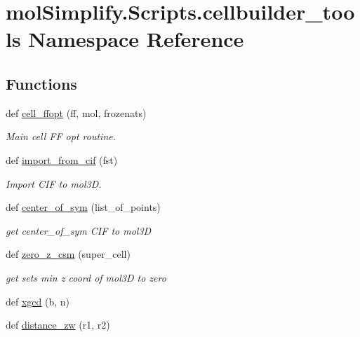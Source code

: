 \hypertarget{namespacemolSimplify_1_1Scripts_1_1cellbuilder__tools}{}\section{mol\+Simplify.\+Scripts.\+cellbuilder\+\_\+tools Namespace Reference}
\label{namespacemolSimplify_1_1Scripts_1_1cellbuilder__tools}
\subsection*{Functions}
\begin{DoxyCompactItemize}
\item 
def \hyperlink{namespacemolSimplify_1_1Scripts_1_1cellbuilder__tools_afa7cdfc8a30fd53f9784466e662d2aec}{cell\+\_\+ffopt} (ff, mol, frozenats)
\begin{DoxyCompactList}\small\item\em Main cell FF opt routine. \end{DoxyCompactList}\item 
def \hyperlink{namespacemolSimplify_1_1Scripts_1_1cellbuilder__tools_af7e25ca0eee7ea70e3d886dfac1b77ff}{import\+\_\+from\+\_\+cif} (fst)
\begin{DoxyCompactList}\small\item\em Import C\+IF to mol3D. \end{DoxyCompactList}\item 
def \hyperlink{namespacemolSimplify_1_1Scripts_1_1cellbuilder__tools_af7ec418e4139cc025c32ac5a789ec8bd}{center\+\_\+of\+\_\+sym} (list\+\_\+of\+\_\+points)
\begin{DoxyCompactList}\small\item\em get center\+\_\+of\+\_\+sym C\+IF to mol3D \end{DoxyCompactList}\item 
def \hyperlink{namespacemolSimplify_1_1Scripts_1_1cellbuilder__tools_a14494cd56f48f40e5437d8ca73f4b706}{zero\+\_\+z\+\_\+csm} (super\+\_\+cell)
\begin{DoxyCompactList}\small\item\em get sets min z coord of mol3D to zero \end{DoxyCompactList}\item 
def \hyperlink{namespacemolSimplify_1_1Scripts_1_1cellbuilder__tools_aa581e15be1f5816ef35d571cc0477100}{xgcd} (b, n)
\item 
def \hyperlink{namespacemolSimplify_1_1Scripts_1_1cellbuilder__tools_ab9c8e3fbb8626a035c3b4d7b64f13e57}{distance\+\_\+zw} (r1, r2)

\end{DoxyCompactItemize}
